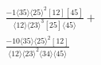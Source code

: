 \documentclass[varwidth, border=5pt]{standalone}
\begin{document}
\begin{my}
$\begin{gathered}
\scriptscriptstyle\frac{-1⟨35⟩⟨25⟩^2[12][45]}{⟨12⟩⟨23⟩^3[25]⟨45⟩}+\\
\scriptscriptstyle\frac{-10⟨35⟩⟨25⟩^2[12]}{⟨12⟩⟨23⟩^2⟨34⟩⟨45⟩}\phantom{+}
\end{gathered}$
\end{my}
\end{document}
